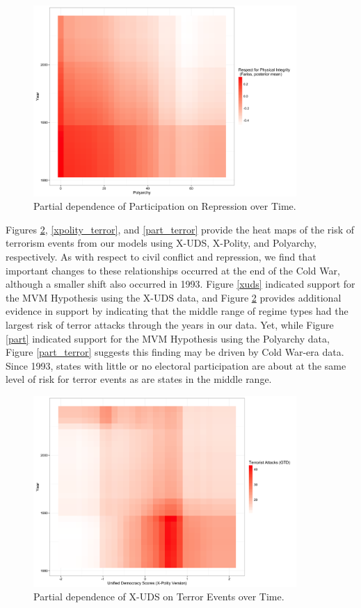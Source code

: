 \documentclass[titlepage, onecolumn,12pt]{article}
\begin{document}
\begin{figure}[ht!]
\begin{center}
\includegraphics[width=100mm]{../figures/latent_mean_part_int_year_tile.png}
\end{center}
\caption{Partial dependence of Participation on Repression over Time.}
\label{part_rep}
\end{figure}

Figures \ref{xuds_terror}, \ref{xpolity_terror}, and \ref{part_terror} provide the heat maps of the risk of terrorism events from our models using X-UDS, X-Polity, and Polyarchy, respectively.  As with respect to civil conflict and repression, we find that important changes to these relationships occurred at the end of the Cold War, although a smaller shift also occurred in 1993.  Figure \ref{xuds} indicated support for the MVM Hypothesis using the X-UDS data, and Figure \ref{xuds_terror} provides additional evidence in support by indicating that the middle range of regime types had the largest risk of terror attacks through the years in our data.  Yet, while Figure \ref{part} indicated support for the MVM Hypothesis using the Polyarchy data, Figure \ref{part_terror} suggests this finding may be driven by Cold War-era data.  Since 1993, states with little or no electoral participation are about at the same level of risk for terror events as are states in the middle range.

\clearpage

\begin{figure}[ht!]
\begin{center}
\includegraphics[width=100mm]{../figures/terror_events_uds_xpolity_int_year_tile.png}
\end{center}
\caption{Partial dependence of X-UDS on Terror Events over Time.}
\label{xuds_terror}
\end{figure}
\end{document}
